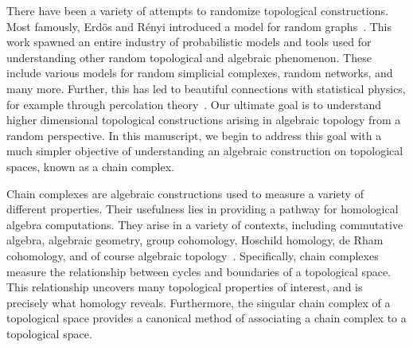 There have been a variety of attempts to randomize topological constructions.
Most famously, Erd\"os and R\'enyi introduced a model for random
graphs~\cite{erdos_random_1959, erdos_evolution_1960}.  This work spawned an
entire industry of probabilistic models and tools used for understanding other
random topological and algebraic phenomenon. These include various models for
random simplicial complexes, random networks, and many more. Further, this has
led to beautiful connections with statistical physics, for example through
percolation theory~\cite{broadbent_percolation_1957, bollobas_2006_percolation,
kesten_percolation_1982}.  Our ultimate goal is to understand higher
dimensional topological constructions arising in algebraic topology from a
random perspective. In this manuscript, we begin to address this goal with a
much simpler objective of understanding an algebraic construction on
topological spaces, known as a chain complex. 

Chain complexes are algebraic constructions used to measure a variety of
different properties. Their usefulness lies in providing a pathway for
homological algebra computations. They arise in a variety of contexts,
including commutative algebra, algebraic geometry, group cohomology, Hoschild homology, de Rham
cohomology, and of course algebraic topology~\cite{atiyah2018introduction, hartshorne2013algebraic,brown2012cohomology, hochschild1945cohomology, bott2013differential, hatcher2002algebraic}. 
Specifically, chain
complexes measure the relationship between cycles and boundaries of a
topological space. This relationship uncovers many topological properties of
interest, and is precisely what homology reveals. Furthermore,
the singular chain complex of a topological space provides a canonical method
of associating a chain complex to a topological space.


%


